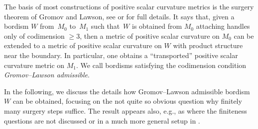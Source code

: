 \documentclass[pdftex]{sigma}
\numberwithin{equation}{section}
\begin{document}
The basis of most constructions of positive scalar curvature metrics
is the surgery theorem of Gromov and Lawson, see
\cite{GromovLawson} or \cite{EbertFrenck} for full details. It says
that, given a bordism $W$ from~$M_0$ to~$M_1$ such that~$W$ is obtained from
$M_0$ attaching handles only of codimension $\ge 3$, then a metric of
positive scalar curvature on $M_0$ can be extended to a metric of positive
scalar curvature on $W$ with product structure near the boundary. In
particular, one obtains a ``transported'' positive scalar curvature metric
on $M_1$. We call bordisms satisfying the codimension condition
\emph{Gromov--Lawson admissible}.

In the following, we discuss the details how Gromov--Lawson admissible
bordism $W$ can be obtained, focusing on the not quite so obvious question
why finitely many surgery steps suffice. The result appears also, e.g., as
\cite[Theorem~2.2]{Rosenberg} where the finiteness questions are not
discussed or in a much more general setup in \cite[Appendix~2]{HebestreitJoachim}.
\end{document}
